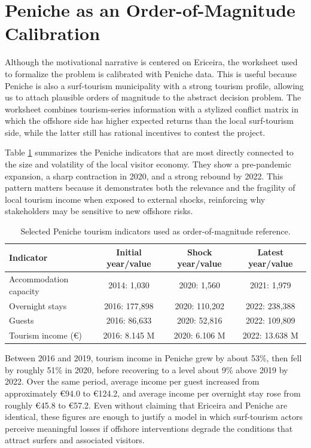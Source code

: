 \documentclass[final,times,authoryear]{elsarticle}
\begin{document}
\section{Peniche as an Order-of-Magnitude Calibration}
\label{sec_peniche}

Although the motivational narrative is centered on Ericeira, the worksheet used to formalize the problem is calibrated with Peniche data. This is useful because Peniche is also a surf-tourism municipality with a strong tourism profile, allowing us to attach plausible orders of magnitude to the abstract decision problem. The worksheet combines tourism-series information with a stylized conflict matrix in which the offshore side has higher expected returns than the local surf-tourism side, while the latter still has rational incentives to contest the project.

Table \ref{tab:peniche_series} summarizes the Peniche indicators that are most directly connected to the size and volatility of the local visitor economy. They show a pre-pandemic expansion, a sharp contraction in 2020, and a strong rebound by 2022. This pattern matters because it demonstrates both the relevance and the fragility of local tourism income when exposed to external shocks, reinforcing why stakeholders may be sensitive to new offshore risks.

\begin{table}[H]
\centering
\caption{Selected Peniche tourism indicators used as order-of-magnitude reference.}
\label{tab:peniche_series}
\begin{tabular}{lccc}
\toprule
Indicator & Initial year/value & Shock year/value & Latest year/value \\
\midrule
Accommodation capacity & 2014: 1,030 & 2020: 1,560 & 2021: 1,979 \\
Overnight stays & 2016: 177,898 & 2020: 110,202 & 2022: 238,388 \\
Guests & 2016: 86,633 & 2020: 52,816 & 2022: 109,809 \\
Tourism income (\euro) & 2016: 8.145 M & 2020: 6.106 M & 2022: 13.638 M \\
\bottomrule
\end{tabular}
\end{table}

Between 2016 and 2019, tourism income in Peniche grew by about 53\%, then fell by roughly 51\% in 2020, before recovering to a level about 9\% above 2019 by 2022. Over the same period, average income per guest increased from approximately \euro94.0 to \euro124.2, and average income per overnight stay rose from roughly \euro45.8 to \euro57.2. Even without claiming that Ericeira and Peniche are identical, these figures are enough to justify a model in which surf-tourism actors perceive meaningful losses if offshore interventions degrade the conditions that attract surfers and associated visitors.
\end{document}
